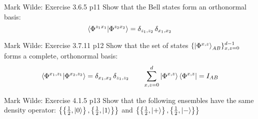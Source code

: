 \documentclass[a4paper, 11pt]{article}
\begin{document}
\begin{problem}{%
		Mark Wilde: Exercise 3.6.5
	}{p11%
	}
	Show that the Bell states form an orthonormal basis: $$\bra{\Phi^{z_1x_1}}\ket{\Phi^{z_2x_2}}=\delta_{z_1,z_2}\,\delta_{x_1,x_2}$$
\end{problem}


\begin{problem}{%
		Mark Wilde: Exercise 3.7.11
	}{p12%
	}
	 Show that the set of states $\{\ket{\Phi^{x,z}}_{AB}\}^{d-1}_{x,z=0}$ forms a complete, orthonormal basis:$$\bra{\Phi^{x_1,z_1}}\ket{\Phi^{x_2,z_2}}=\delta_{x_1,x_2}\,\delta_{z_1,z_2}\qquad \sum_{x,z=0}^d\ket{\Phi^{x,z}}\bra{\Phi^{x,z}}=I_{AB}$$
\end{problem}


\begin{problem}{%
		Mark Wilde: Exercise 4.1.5
	}{p13%
	}
	 Show that the following ensembles have the same density operator: $\left\{\left\{\frac12,\ket{0}\right\},\left\{\frac12,\ket{1}\right\}\right\}$ and $\left\{\left\{\frac12,\ket{+}\right\},\left\{\frac12,\ket{-}\right\}\right\}$
\end{problem}
\end{document}
